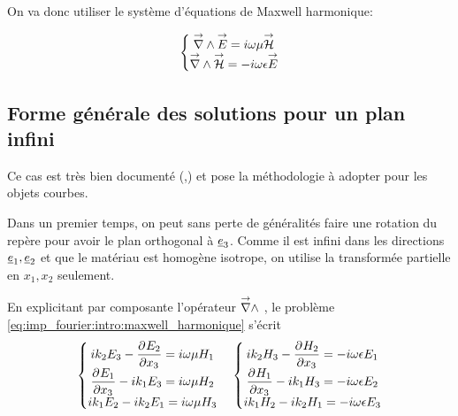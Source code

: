 On va donc utiliser le système d'équations de Maxwell harmonique:

\begin{equation}
    \left\lbrace 
    \begin{matrix}
    \vrot \vE = i \omega \mu \vH \\
    \vrot \vH = -i \omega \eps \vE
    \end{matrix}
    \right.
    \label{eq:imp_fourier:intro:maxwell_harmonique}
\end{equation}


\subsection{Forme générale des solutions pour un plan infini}

Ce cas est très bien documenté (\cite{senior_approximate_1995},\cite{hoppe_impedance_1995}) et pose la méthodologie à adopter pour les objets courbes. 

Dans un premier temps, on peut sans perte de généralités faire une rotation du repère pour avoir le plan orthogonal à $\v e_3$. Comme il est infini dans les directions $\v e_1, \v e_2$ et que le matériau est homogène isotrope, on utilise la transformée partielle en $x_1, x_2$ seulement.

\renewcommand{\x}{{\v e_1}}
\renewcommand{\y}{{\v e_2}}
\renewcommand{\z}{{\v e_3}}
\renewcommand{\peps}{{\eps}}
\renewcommand{\pmu}{{\mu}}
\begin{figure}[h!]
\centering
\begin{tikzpicture}

\end{tikzpicture}
\end{figure}

En explicitant par composante l'opérateur $\vrot$ , le problème \eqref{eq:imp_fourier:intro:maxwell_harmonique} s'écrit  
\begin{align*}
    \left\lbrace 
    \begin{matrix}
    ik_2 E_3  - \ddr{x_3}{E_ 2} = i \w \mu H_1 \\
    \ddr{x_3}{E_1} - ik_1 E_3 = i\w \mu H_2 \\
    ik_1 E_2 - ik_2 E_1 = i\w \mu H_3 \\
    \end{matrix}
    \right. \quad 
    \left\lbrace 
    \begin{matrix}
    ik_2 H_3  - \ddr{x_3}{H_ 2} = -i \w \eps E_1 \\
    \ddr{x_3}{H_1} - ik_1 H_3 = -i\w \eps E_2 \\
    ik_1 H_2 - ik_2 H_1 = -i\w \eps E_3 \\
    \end{matrix}
    \right.
\end{align*}

